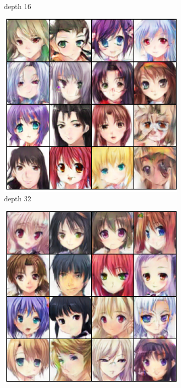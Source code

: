 \begin{figure}[H]
\begin{subfigure}[b]{0.24\textwidth}
        \caption{depth 16}
        \label{fig:anime_16}
    \end{subfigure}
    \hfill
    \begin{subfigure}[b]{0.24\textwidth}
        \centering
        \includegraphics[width=\textwidth]{resources/images/output_anime_32.eps}
        \caption{depth 32}
        \label{fig:anime_32}
    \end{subfigure}
    \hfill
    \begin{subfigure}[b]{0.24\textwidth}
        \centering
        \includegraphics[width=\textwidth]{resources/images/output_anime_64.eps}

\end{subfigure}
\end{figure}
